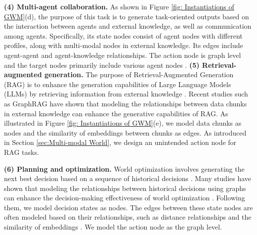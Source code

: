 \textbf{(4) Multi-agent collaboration.} As shown in Figure \ref{fig: Instantiations of GWM}(d), the purpose \citep{zhuge2024language,liu2023dynamic,wu2024agentkit} of this task is to generate task-oriented outputs based on the interaction between agents and external knowledge, as well as communication among agents. Specifically, its state nodes consist of agent nodes with different profiles, along with multi-modal nodes in external knowledge. Its edges include agent-agent and agent-knowledge relationships. The action node is graph level and the target nodes primarily include various agent nodes \citep{zhuge2024language,liu2023dynamic}.
\textbf{(5) Retrieval-augmented generation.} The purpose of Retrieval-Augmented Generation (RAG) is to enhance the generation capabilities of Large Language Models (LLMs) by retrieving information from external knowledge \citep{lewis2020retrieval,gao2023retrieval,zhao2024retrieval}. Recent studies such as GraphRAG \citep{edge2024local,peng2024graph} have shown that modeling the relationships between data chunks in external knowledge can enhance the generative capabilities of RAG. As illustrated in Figure \ref{fig: Instantiations of GWM}(e), we model data chunks as nodes and the similarity of embeddings between chunks as edges. As introduced in Section \ref{sec:Multi-modal World}, we design an unintended action node for RAG tasks.


\textbf{(6) Planning and optimization.} World optimization involves generating the next best decision based on a sequence of historical decisions \citep{chen2021decision,zheng2022online,siebenborn2022crucial}. Many studies have shown that modeling the relationships between historical decisions using graphs can enhance the decision-making effectiveness of world optimization \citep{jiang2018graph,munikoti2023challenges}. Following them, we model decision states as  nodes. The edges between these state nodes are often modeled based on their relationships, such as distance relationships \citep{prates2019learning} and the similarity of embeddings \citep{munikoti2023challenges, jiang2018graph}. We model the action node as the graph level.

